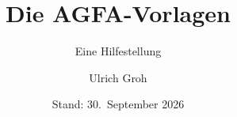 \titlehead{Universität Tübingen \\
	Mathematisch-Naturwissenschaftliche Fakultät \\
	Fachbereich Mathematik}
\subject{\LaTeX}
\title{Die AGFA-Vorlagen}
\subtitle{Eine Hilfestellung}
\author{Ulrich Groh}
\date{Stand: 30.~September 2026}
\publishers{\url{https://github.com/ugroh/AGFA-Master}}
\maketitle
\cleardoublepage
